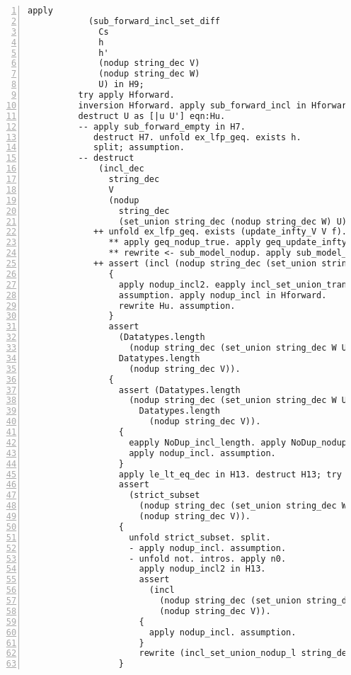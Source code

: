 \begin{lstlisting}[language=Coq, label={lst:thm_32_full_proof}, caption={Full proof of Theorem 3.2 in Coq}, numbers=left]
          apply
            (sub_forward_incl_set_diff
              Cs
              h
              h'
              (nodup string_dec V)
              (nodup string_dec W)
              U) in H9;
          try apply Hforward.
          inversion Hforward. apply sub_forward_incl in Hforward.
          destruct U as [|u U'] eqn:Hu.
          -- apply sub_forward_empty in H7.
             destruct H7. unfold ex_lfp_geq. exists h.
             split; assumption.
          -- destruct
              (incl_dec
                string_dec
                V
                (nodup
                  string_dec
                  (set_union string_dec (nodup string_dec W) U))).
             ++ unfold ex_lfp_geq. exists (update_infty_V V f). split.
                ** apply geq_nodup_true. apply geq_update_infty_V.
                ** rewrite <- sub_model_nodup. apply sub_model_update_infty_V.
             ++ assert (incl (nodup string_dec (set_union string_dec W U)) V).
                {
                  apply nodup_incl2. eapply incl_set_union_trans.
                  assumption. apply nodup_incl in Hforward.
                  rewrite Hu. assumption.
                }
                assert
                  (Datatypes.length
                    (nodup string_dec (set_union string_dec W U)) <
                  Datatypes.length
                    (nodup string_dec V)).
                {
                  assert (Datatypes.length
                    (nodup string_dec (set_union string_dec W U)) <=
                      Datatypes.length
                        (nodup string_dec V)).
                  {
                    eapply NoDup_incl_length. apply NoDup_nodup.
                    apply nodup_incl. assumption.
                  }
                  apply le_lt_eq_dec in H13. destruct H13; try assumption.
                  assert
                    (strict_subset
                      (nodup string_dec (set_union string_dec W U))
                      (nodup string_dec V)).
                  {
                    unfold strict_subset. split.
                    - apply nodup_incl. assumption.
                    - unfold not. intros. apply n0.
                      apply nodup_incl2 in H13.
                      assert
                        (incl
                          (nodup string_dec (set_union string_dec W U))
                          (nodup string_dec V)).
                      {
                        apply nodup_incl. assumption.
                      }
                      rewrite (incl_set_union_nodup_l string_dec). assumption.
                  }

\end{lstlisting}
